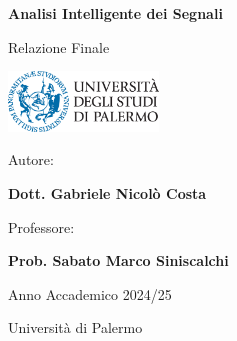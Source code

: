 \begin{titlepage}
    \centering
    {\Huge \bfseries Analisi Intelligente dei Segnali \par}
    \vspace{1.5cm}
    {\Large Relazione Finale \par}
    \vspace{2cm}
    
    \includegraphics[width=0.3\textwidth]{logounipa.png} %
    
    \vspace{2cm}
    
    {\Large Autore:\par}
    {\Large \textbf{Dott. Gabriele Nicolò Costa} \par}
    
    \vspace{1cm}
    
    {\Large Professore:\par}
    {\Large \textbf{Prob. Sabato Marco Siniscalchi} \par}
    
    \vspace{1cm}
    
    {\Large Anno Accademico 2024/25 \par}
    
    \vfill
    
    {\large Università di Palermo \par}
\end{titlepage}